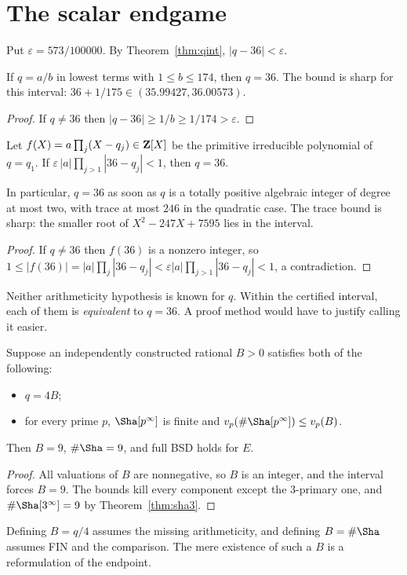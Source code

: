 \section{The scalar endgame}\label{sec:scalar}

Put $\varepsilon=573/100000$. By Theorem~\ref{thm:qint}, $|q-36|<\varepsilon$.

\begin{proposition}\label{prop:ratl}
If $q=a/b$ in lowest terms with $1\le b\le174$, then $q=36$. The bound is sharp for this interval: $36+1/175\in(35.99427,36.00573)$.
\end{proposition}
\begin{proof}
If $q\neq36$ then $|q-36|\ge1/b\ge1/174>\varepsilon$.
\end{proof}

\begin{proposition}\label{prop:alg}
Let $f(X)=a\prod_j(X-q_j)\in\mathbf{Z}[X]$ be the primitive irreducible polynomial of $q=q_1$. If $\varepsilon\,|a|\prod_{j>1}|36-q_j|<1$, then $q=36$.

In particular, $q=36$ as soon as $q$ is a totally positive algebraic integer of degree at most two, with trace at most $246$ in the quadratic case. The trace bound is sharp: the smaller root of $X^2-247X+7595$ lies in the interval.
\end{proposition}
\begin{proof}
If $q\ne36$ then $f(36)$ is a nonzero integer, so $1\le|f(36)|=|a|\prod_j|36-q_j|<\varepsilon|a|\prod_{j>1}|36-q_j|<1$, a contradiction.
\end{proof}

Neither arithmeticity hypothesis is known for $q$. Within the certified interval, each of them is \emph{equivalent} to $q=36$. A proof method would have to justify calling it easier.

\begin{proposition}\label{prop:commonB}
Suppose an independently constructed rational $B>0$ satisfies both of the following:
\begin{itemize}[leftmargin=*]
\item $q=4B$;
\item for every prime $p$, $\Sha[p^\infty]$ is finite and $v_p(\#\Sha[p^\infty])\le v_p(B)$.
\end{itemize}
Then $B=9$, $\#\Sha=9$, and full BSD holds for $E$.
\end{proposition}
\begin{proof}
All valuations of $B$ are nonnegative, so $B$ is an integer, and the interval forces $B=9$. The bounds kill every component except the $3$-primary one, and $\#\Sha[3^\infty]=9$ by Theorem~\ref{thm:sha3}.
\end{proof}
Defining $B=q/4$ assumes the missing arithmeticity, and defining $B=\#\Sha$ assumes FIN and the comparison. The mere existence of such a $B$ is a reformulation of the endpoint.

